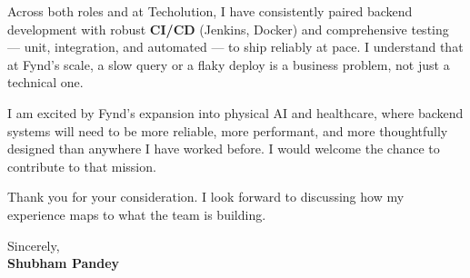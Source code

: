 \documentclass[a4paper,11pt]{article}
\begin{document}
\vspace{10pt}

Across both roles and at Techolution, I have consistently paired backend development with robust \textbf{CI/CD} (Jenkins, Docker) and comprehensive testing --- unit, integration, and automated --- to ship reliably at pace. I understand that at Fynd's scale, a slow query or a flaky deploy is a business problem, not just a technical one.

\vspace{10pt}

I am excited by Fynd's expansion into physical AI and healthcare, where backend systems will need to be more reliable, more performant, and more thoughtfully designed than anywhere I have worked before. I would welcome the chance to contribute to that mission.

\vspace{10pt}

Thank you for your consideration. I look forward to discussing how my experience maps to what the team is building.

\vspace{20pt}

Sincerely,\\
\textbf{Shubham Pandey}
\end{document}
